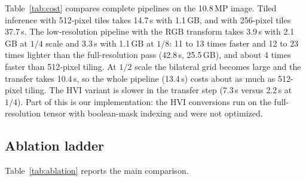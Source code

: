 \documentclass[runningheads]{llncs}
\begin{document}
Table~\ref{tab:cost} compares complete pipelines on the 10.8\,MP image. Tiled inference with 512-pixel tiles takes 14.7\,s with 1.1\,GB, and with 256-pixel tiles 37.7\,s. The low-resolution pipeline with the RGB transform takes 3.9\,s with 2.1\,GB at $1/4$ scale and 3.3\,s with 1.1\,GB at $1/8$: 11 to 13 times faster and 12 to 23 times lighter than the full-resolution pass (42.8\,s, 25.5\,GB), and about 4 times faster than 512-pixel tiling. At $1/2$ scale the bilateral grid becomes large and the transfer takes 10.4\,s, so the whole pipeline (13.4\,s) costs about as much as 512-pixel tiling. The HVI variant is slower in the transfer step (7.3\,s versus 2.2\,s at $1/4$). Part of this is our implementation: the HVI conversions run on the full-resolution tensor with boolean-mask indexing and were not optimized.

\subsection{Ablation ladder}
Table~\ref{tab:ablation} reports the main comparison.
\end{document}
